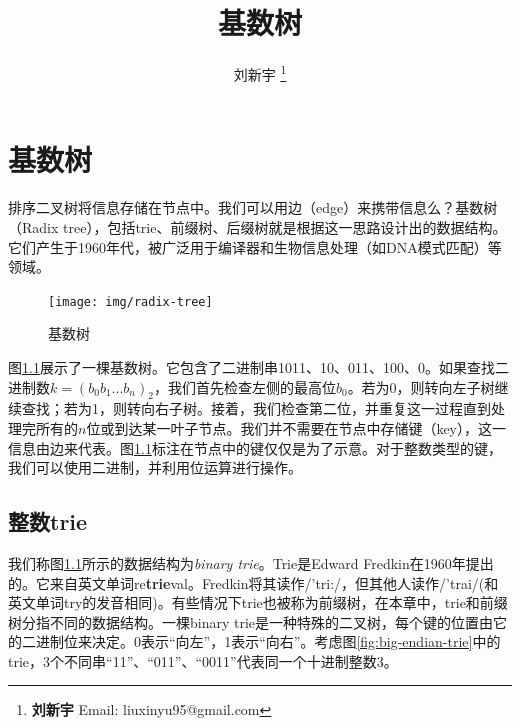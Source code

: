 \documentclass[b5paper]{ctexart}
\begin{document}
\title{基数树}

\author{刘新宇
\thanks{{\bfseries 刘新宇 } \newline
  Email: liuxinyu95@gmail.com \newline}
  }

\maketitle
\fi


\ifx\wholebook\relax
\chapter{基数树}
\fi

\label{introduction} 

排序二叉树将信息存储在节点中。我们可以用边（edge）来携带信息么？基数树（Radix tree），包括trie、前缀树、后缀树就是根据这一思路设计出的数据结构。它们产生于1960年代，被广泛用于编译器\cite{okasaki-int-map}和生物信息处理（如DNA模式匹配）\cite{wiki-suffix-tree}等领域。

\begin{figure}[htbp]
  \centering
  \texttt{[image: img/radix-tree]}
  \caption{基数树}
  \label{fig:radix-tree}
\end{figure}

图\ref{fig:radix-tree}展示了一棵基数树。它包含了二进制串1011、10、011、100、0。如果查找二进制数$k=(b_0b_1...b_n)_2$，我们首先检查左侧的最高位$b_0$。若为0，则转向左子树继续查找；若为1，则转向右子树。接着，我们检查第二位，并重复这一过程直到处理完所有的$n$位或到达某一叶子节点。我们并不需要在节点中存储键（key），这一信息由边来代表。图\ref{fig:radix-tree}标注在节点中的键仅仅是为了示意。对于整数类型的键，我们可以使用二进制，并利用位运算进行操作。

\section{整数trie}
\label{int-trie} 

我们称图\ref{fig:radix-tree}所示的数据结构为\emph{binary trie}。Trie是Edward Fredkin在1960年提出的。它来自英文单词re\textbf{trie}val。Fredkin将其读作/'tri:/，但其他人读作/'trai/(和英文单词try的发音相同)\cite{wiki-trie}。有些情况下trie也被称为前缀树，在本章中，trie和前缀树分指不同的数据结构。一棵binary trie是一种特殊的二叉树，每个键的位置由它的二进制位来决定。0表示“向左”，1表示“向右”\cite{okasaki-int-map}。考虑图\ref{fig:big-endian-trie}中的trie，3个不同串``11''、``011''、``0011''代表同一个十进制整数3。
\end{document}
